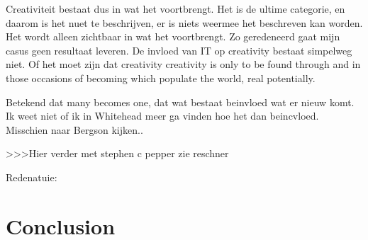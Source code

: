 Creativiteit bestaat dus in wat het voortbrengt. Het is de ultime categorie, en daarom is het nuet te beschrijven, er is niets weermee het beschreven kan worden. Het wordt alleen zichtbaar in wat het voortbrengt.
Zo geredeneerd gaat mijn casus geen resultaat leveren. De invloed van IT op creativity bestaat simpelweg niet. 
Of het moet zijn dat creativity creativity is only to be found through and in those occasions
of becoming which populate the world, real potentially.

Betekend dat many becomes one, dat wat bestaat beinvloed wat er nieuw komt.
Ik weet niet of ik in Whitehead meer ga vinden hoe het dan beincvloed. Misschien naar Bergson kijken..

>>>Hier verder met stephen c pepper zie reschner


Redenatuie:



\section{Conclusion}